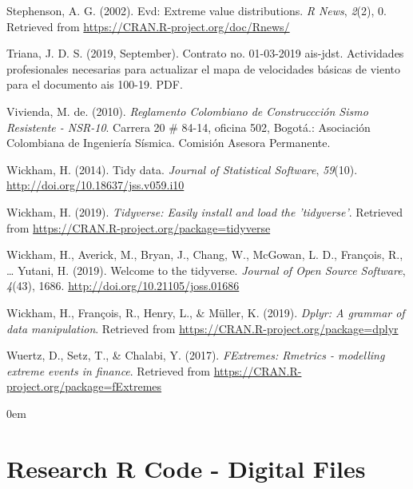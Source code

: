 \documentclass[12pt,twoside]{reedthesis}
\begin{document}
\leavevmode\hypertarget{ref-Stephenson2002}{}%
Stephenson, A. G. (2002). Evd: Extreme value distributions. \emph{R News}, \emph{2}(2), 0. Retrieved from \url{https://CRAN.R-project.org/doc/Rnews/}

\leavevmode\hypertarget{ref-triana2019}{}%
Triana, J. D. S. (2019, September). Contrato no. 01-03-2019 ais-jdst. Actividades profesionales necesarias para actualizar el mapa de velocidades básicas de viento para el documento ais 100-19. PDF.

\leavevmode\hypertarget{ref-nsr10}{}%
Vivienda, M. de. (2010). \emph{Reglamento Colombiano de Construccción Sismo Resistente - NSR-10}. Carrera 20 \# 84-14, oficina 502, Bogotá.: Asociación Colombiana de Ingeniería Sísmica. Comisión Asesora Permanente.

\leavevmode\hypertarget{ref-Wickham2014}{}%
Wickham, H. (2014). Tidy data. \emph{Journal of Statistical Software}, \emph{59}(10). \url{http://doi.org/10.18637/jss.v059.i10}

\leavevmode\hypertarget{ref-Wickham2019a}{}%
Wickham, H. (2019). \emph{Tidyverse: Easily install and load the 'tidyverse'}. Retrieved from \url{https://CRAN.R-project.org/package=tidyverse}

\leavevmode\hypertarget{ref-Wickham2019b}{}%
Wickham, H., Averick, M., Bryan, J., Chang, W., McGowan, L. D., François, R., \ldots{} Yutani, H. (2019). Welcome to the tidyverse. \emph{Journal of Open Source Software}, \emph{4}(43), 1686. \url{http://doi.org/10.21105/joss.01686}

\leavevmode\hypertarget{ref-Wickham2019}{}%
Wickham, H., François, R., Henry, L., \& Müller, K. (2019). \emph{Dplyr: A grammar of data manipulation}. Retrieved from \url{https://CRAN.R-project.org/package=dplyr}

\leavevmode\hypertarget{ref-Wuertz2017}{}%
Wuertz, D., Setz, T., \& Chalabi, Y. (2017). \emph{FExtremes: Rmetrics - modelling extreme events in finance}. Retrieved from \url{https://CRAN.R-project.org/package=fExtremes}

\noindent

\setlength{\parindent}{-0.20in}
\setlength{\leftskip}{0.20in}
\setlength{\parskip}{8pt}

\appendix

\parindent0em

\hypertarget{rcode}{%
\chapter{Research R Code - Digital Files}\label{rcode}}
\end{document}
